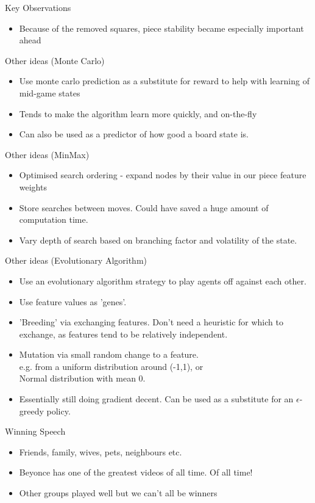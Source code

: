 \documentclass{beamer}
\begin{document}
\begin{frame}{Key Observations}
    \begin{itemize}
  \item
    Because of the removed squares, piece stability became especially important ahead
  \end{itemize}
\end{frame}

\begin{frame}{Other ideas (Monte Carlo)}
    \begin{itemize}
  \item
    	Use monte carlo prediction as a substitute for reward to help with learning of mid-game states
  \item
	Tends to make the algorithm learn more quickly, and on-the-fly
  \item
	Can also be used as a predictor of how good a board state is.
  \end{itemize}
\end{frame}

\begin{frame}{Other ideas (MinMax)}
    \begin{itemize}
  \item
    Optimised search ordering - expand nodes by their value in our piece feature weights
  \item
	Store searches between moves. Could have saved a huge amount of computation time.
  \item
	Vary depth of search based on branching factor and volatility of the state.
  \end{itemize}
\end{frame}

\begin{frame}{Other ideas (Evolutionary Algorithm)}
    \begin{itemize}
  \item
   	Use an evolutionary algorithm strategy to play agents off against each other.
  \item
	Use feature values as 'genes'.
  \item
	'Breeding' via exchanging features. Don't need a heuristic for which to exchange, as features tend to be relatively independent.
  \item
	Mutation via small random change to a feature.
	\\ e.g. from a uniform distribution around (-1,1), or
	\\ Normal distribution with mean 0.
  \item
	Essentially still doing gradient decent. Can be used as a substitute for an $\epsilon$-greedy policy.
  \end{itemize}
\end{frame}

\begin{frame}{Winning Speech}
    \begin{itemize}
  \item
    Friends, family, wives, pets, neighbours etc.
  \item
   Beyonce has one of the greatest videos of all time. Of all time!
  \item
   Other groups played well but we can't all be winners
  \end{itemize}
\end{frame}
\end{document}
